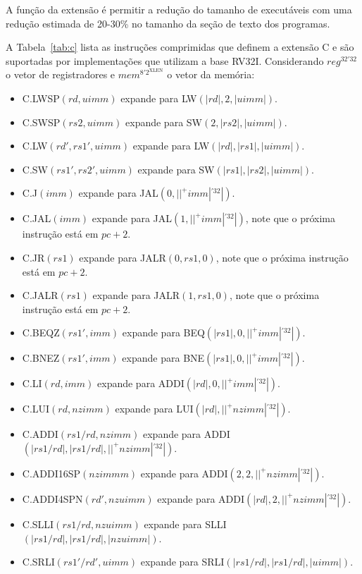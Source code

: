   A função da extensão é permitir a redução do tamanho de executáveis com uma redução estimada de 20-30\%
  no tamanho da seção de texto dos programas.

  A Tabela~\ref{tab:c} lista as instruções comprimidas que definem a extensão C e são suportadas por
  implementações que utilizam a base RV32I. Considerando $reg^{32'32}$ o vetor de registradores e
  $mem^{8'2^\text{XLEN}}$ o vetor da memória:

  \begin{itemize}
  
  \item C.LWSP$(rd, uimm)$ expande para LW$(|rd|, 2, |uimm|)$.
  \item C.SWSP$(rs2, uimm)$ expande para SW$(2,|rs2|,|uimm|)$.
  \item C.LW$(rd', rs1', uimm)$ expande para LW$(|rd|, |rs1|, |uimm|)$.
  \item C.SW$(rs1', rs2', uimm)$ expande para SW$(|rs1|, |rs2|, |uimm|)$.
  \item C.J$(imm)$ expande para JAL$(0, ||^+imm|^{'32}|)$.
  \item C.JAL$(imm)$ expande para JAL$(1, ||^+imm|^{'32}|)$, note que o próxima instrução está em $pc+2$.
  \item C.JR$(rs1)$ expande para JALR$(0, rs1, 0)$, note que o próxima instrução está em $pc+2$.
  \item C.JALR$(rs1)$ expande para JALR$(1, rs1, 0)$, note que o próxima instrução está em $pc+2$.
  \item C.BEQZ$(rs1', imm)$ expande para BEQ$(|rs1|, 0, ||^+imm|^{'32}|)$.
  \item C.BNEZ$(rs1', imm)$ expande para BNE$(|rs1|, 0, ||^+imm|^{'32}|)$.
  \item C.LI$(rd, imm)$ expande para ADDI$(|rd|, 0, ||^+imm|^{'32}|)$.
  \item C.LUI$(rd, nzimm)$ expande para LUI$(|rd|, ||^+nzimm|^{'32}|)$.
  \item C.ADDI$(rs1/rd, nzimm)$ expande para ADDI$(|rs1/rd|, |rs1/rd|, ||^+nzimm|^{'32}|)$.
  \item C.ADDI16SP$(nzimmm)$ expande para ADDI$(2, 2, ||^+nzimm|^{'32}|)$.
  \item C.ADDI4SPN$(rd', nzuimm)$ expande para ADDI$(|rd|, 2, ||^+nzimm|^{'32}|)$.
  \item C.SLLI$(rs1/rd, nzuimm)$ expande para SLLI$(|rs1/rd|, |rs1/rd|, |nzuimm|)$.
  \item C.SRLI$(rs1'/rd', uimm)$ expande para SRLI$(|rs1/rd|, |rs1/rd|, |uimm|)$.

\end{itemize}
